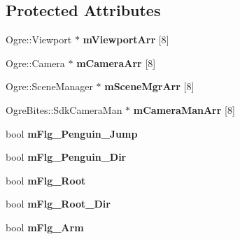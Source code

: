 \subsection*{Protected Attributes}
\begin{DoxyCompactItemize}
\item 
\mbox{\label{class_basic_tutorial__00_a6676a92b50e9b43634d4c66488537b73}} 
Ogre\+::\+Viewport $\ast$ {\bfseries m\+Viewport\+Arr} \mbox{[}8\mbox{]}
\item 
\mbox{\label{class_basic_tutorial__00_af8d457d912286a98c0975c52d4faf910}} 
Ogre\+::\+Camera $\ast$ {\bfseries m\+Camera\+Arr} \mbox{[}8\mbox{]}
\item 
\mbox{\label{class_basic_tutorial__00_a603779b6087698c57b7989e16d8a9b93}} 
Ogre\+::\+Scene\+Manager $\ast$ {\bfseries m\+Scene\+Mgr\+Arr} \mbox{[}8\mbox{]}
\item 
\mbox{\label{class_basic_tutorial__00_a700c07f924c71e9fa1885a46f599d934}} 
Ogre\+Bites\+::\+Sdk\+Camera\+Man $\ast$ {\bfseries m\+Camera\+Man\+Arr} \mbox{[}8\mbox{]}
\item 
\mbox{\label{class_basic_tutorial__00_a3bab828aedf96ec7950d7bffd8ba8662}} 
bool {\bfseries m\+Flg\+\_\+\+Penguin\+\_\+\+Jump}
\item 
\mbox{\label{class_basic_tutorial__00_aebd1f2b620704e6d68bda2d4f253d5f8}} 
bool {\bfseries m\+Flg\+\_\+\+Penguin\+\_\+\+Dir}
\item 
\mbox{\label{class_basic_tutorial__00_a349e412bbd2ef928355526434ad068e0}} 
bool {\bfseries m\+Flg\+\_\+\+Root}
\item 
\mbox{\label{class_basic_tutorial__00_aeb4016c6120ea867c5b35ed2e0360127}} 
bool {\bfseries m\+Flg\+\_\+\+Root\+\_\+\+Dir}
\item 
\mbox{\label{class_basic_tutorial__00_aadfacdefd397fa239d3d9e1aaf350a22}} 
bool {\bfseries m\+Flg\+\_\+\+Arm}
\item 
\mbox{\label{class_basic_tutorial__00_ac2cef9437b6ad5f4851683f7fc797c98}} 

\end{DoxyCompactItemize}
